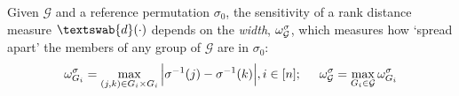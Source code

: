   Given $\mathcal{G}$ and a reference permutation $\sigma_0$, the sensitivity of a rank distance measure $\textswab{d}(\cdot)$ depends on the \emph{width}, $\omega_{\mathcal{G}}^{\sigma}$, which measures how `spread apart' the members of any group of $\mathcal{G}$ are in $\sigma_0$:\vspace{-0.2cm}
 \begin{align*}
     \omega_{G_i}^{\sigma}= \max_{(j,k) \in G_i \times G_i} \Big| \sigma^{-1}(j) - \sigma^{-1}(k) \Big|, i \in [n];  \hspace{0.5cm}
    \omega_{\calG}^{\sigma} = \max_{G_i \in \calG} \omega_{G_i}^{\sigma}
     \vspace{-1em}
 \end{align*}

